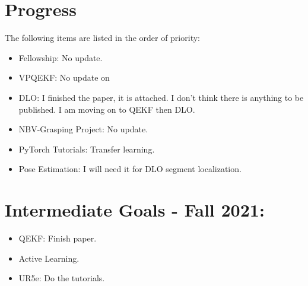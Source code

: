 \documentclass[11pt]{article}
\begin{document}
\section{Progress}
The following items are listed in the order of priority:
\begin{itemize}
      \item Fellowship: No update.
      \item VPQEKF: No update on \cite{quest}
      \item DLO: I finished the paper, it is attached. I don't think there is
      anything to be published. I am moving on to QEKF then DLO.
      \item NBV-Grasping Project: No update.
      \item PyTorch Tutorials: Transfer learning.
      \item Pose Estimation: I will need it for DLO segment localization.
\end{itemize}


\section{Intermediate Goals - Fall 2021:}
\begin{itemize}
      \item QEKF: Finish paper.
      \item Active Learning.
      \item UR5e: Do the tutorials.
\end{itemize}


\newpage


\end{document}
